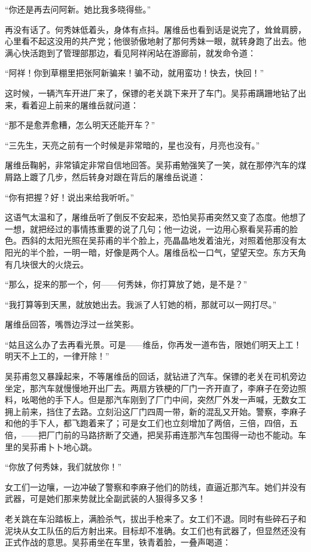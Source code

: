 \par “你还是再去问阿新。她比我多晓得些。”
\par 再没有话了。何秀妹低着头，身体有点抖。屠维岳也看到话是说完了，耸耸肩膀，心里看不起这没用的共产党；他很骄傲地射了那何秀妹一眼，就转身跑了出去。他满心快活跑到了管理部那边，看见阿祥闲站在游廊前，就发命令道：
\par “阿祥！你到草棚里把张阿新骗来！骗不动，就用蛮功！快去，快回！”
\par 这时候，一辆汽车开进厂来了，保镖的老关跳下来开了车门。吴荪甫蹒跚地钻了出来，看着迎上前来的屠维岳就问道：
\par “那不是愈弄愈糟，怎么明天还能开车？”
\par “三先生，天亮之前有一个时候是非常暗的，星也没有，月亮也没有。”
\par 屠维岳鞠躬，非常镇定非常自信地回答。吴荪甫勉强笑了一笑，就在那停汽车的煤屑路上踱了几步，然后转身对跟在背后的屠维岳说道：
\par “你有把握？好！说出来给我听听。”
\par 这语气太温和了，屠维岳听了倒反不安起来，恐怕吴荪甫突然又变了态度。他想了一想，就把经过的事情拣重要的说了几句；他一边说，一边用心察看吴荪甫的脸色。西斜的太阳光照在吴荪甫的半个脸上，亮晶晶地发着油光，对照着他那没有太阳光的半个脸，一明一暗，好像是两个人。屠维岳松一口气，望望天空。东方天角有几块很大的火烧云。
\par “那么，捉来的那一个，何——何秀妹，你打算放了她，是不是？”
\par “我打算等到天黑，就放她出去。我派了人钉她的梢，那就可以一网打尽。”
\par 屠维岳回答，嘴唇边浮过一丝笑影。
\par “姑且这么办了去再看光景。可是——维岳，你再发一道布告，限她们明天上工！明天不上工的，一律开除！”
\par 吴荪甫忽又暴躁起来，不等屠维岳的回话，就钻进了汽车。保镖的老关在司机旁边坐定，那汽车就慢慢地开出厂去。两扇方铁梗的厂门一齐开直了，李麻子在旁边照料，吆喝他的手下人。但是那汽车刚到了厂门中间，突然厂外发一声喊，无数女工拥上前来，挡住了去路。立刻沿这厂门四周一带，新的混乱又开始。警察，李麻子和他的手下人，都飞跑着来了；可是女工们也立刻增加了两倍，三倍，四倍，五倍，——把厂门前的马路挤断了交通，把吴荪甫连那汽车包围得一动也不能动。车里的吴荪甫卜卜地心跳。
\par “你放了何秀妹，我们就放你！”
\par 女工们一边嚷，一边冲破了警察和李麻子他们的防线，直逼近那汽车。她们并没有武器，可是她们那来势就比全副武装的人狠得多又多！
\par 老关跳在车沿踏板上，满脸杀气，拔出手枪来了。女工们不退。同时有些碎石子和泥块从女工队伍的后方射出来。目标却不准确。女工们也有武器了，但显然还没有正式作战的意思。吴荪甫坐在车里，铁青着脸，一叠声喝道：
